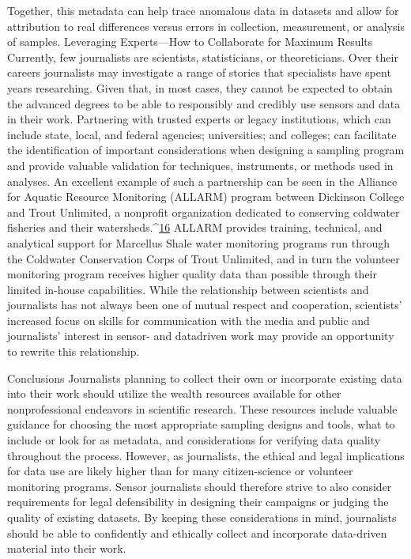 Together, this metadata can help trace anomalous data in datasets and allow
for attribution to real differences versus errors in collection, measurement,
or analysis of samples.
Leveraging Experts—How to Collaborate for
Maximum Results
Currently, few journalists are scientists, statisticians, or theoreticians. Over
their careers journalists may investigate a range of stories that specialists
have spent years researching. Given that, in most cases, they cannot
be expected to obtain the advanced degrees to be able to responsibly and
credibly use sensors and data in their work. Partnering with trusted experts
or legacy institutions, which can include state, local, and federal agencies;
universities; and colleges; can facilitate the identification of important considerations
when designing a sampling program and provide valuable validation
for techniques, instruments, or methods used in analyses.
An excellent example of such a partnership can be seen in the Alliance for
Aquatic Resource Monitoring (ALLARM) program between Dickinson College
and Trout Unlimited, a nonprofit organization dedicated to conserving
coldwater fisheries and their watersheds.^{\href{#endnotes-stauffer}{16}} ALLARM provides training,
technical, and analytical support for Marcellus Shale water monitoring programs
run through the Coldwater Conservation Corps of Trout Unlimited,
and in turn the volunteer monitoring program receives higher quality data
than possible through their limited in-house capabilities. While the relationship
between scientists and journalists has not always been one of mutual
respect and cooperation, scientists' increased focus on skills for communication
with the media and public and journalists' interest in sensor- and datadriven
work may provide an opportunity to rewrite this relationship.

Conclusions
Journalists planning to collect their own or incorporate existing data into
their work should utilize the wealth resources available for other nonprofessional
endeavors in scientific research. These resources include valuable
guidance for choosing the most appropriate sampling designs and tools,
what to include or look for as metadata, and considerations for verifying
data quality throughout the process.
However, as journalists, the ethical and legal implications for data use are
likely higher than for many citizen-science or volunteer monitoring programs.
Sensor journalists should therefore strive to also consider requirements
for legal defensibility in designing their campaigns or judging the
quality of existing datasets. By keeping these considerations in mind, journalists
should be able to confidently and ethically collect and incorporate
data-driven material into their work.

